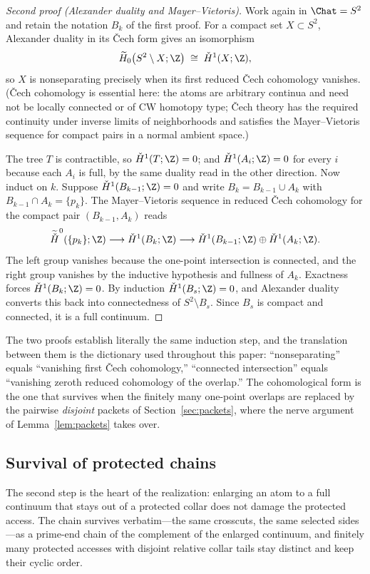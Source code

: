 \begin{proof}[Second proof (Alexander duality and Mayer--Vietoris)]
Work again in $\Chat=S^2$ and retain the notation $B_k$ of the first
proof.  For a compact set $X\subset S^2$, Alexander duality in its
\v{C}ech form \cite[Chapter~6]{Spa66} gives an isomorphism
\[
\widetilde H_0\bigl(S^2\setminus X;\Z\bigr)\;\cong\;\check H^1(X;\Z),
\]
so $X$ is nonseparating precisely when its first reduced \v{C}ech
cohomology vanishes.  (\v{C}ech cohomology is essential here: the atoms
are arbitrary continua and need not be locally connected or of CW
homotopy type; \v{C}ech theory has the required
continuity under inverse limits of neighborhoods and satisfies the
Mayer--Vietoris sequence for compact pairs in a normal ambient space.)

The tree $T$ is contractible, so $\check H^1(T;\Z)=0$; and
$\check H^1(A_i;\Z)=0$ for every $i$ because each $A_i$ is full, by the
same duality read in the other direction.  Now induct on $k$.  Suppose
$\check H^1(B_{k-1};\Z)=0$ and write $B_k=B_{k-1}\cup A_k$ with
$B_{k-1}\cap A_k=\{p_k\}$.  The Mayer--Vietoris sequence in reduced
\v{C}ech cohomology for the compact pair $(B_{k-1},A_k)$ reads
\[
\widetilde{\check H}^0(\{p_k\};\Z)
\longrightarrow
\check H^1(B_k;\Z)
\longrightarrow
\check H^1(B_{k-1};\Z)\oplus\check H^1(A_k;\Z).
\]
The left group vanishes because the one-point intersection is connected,
and the right group vanishes by the inductive hypothesis and fullness of
$A_k$.  Exactness forces $\check H^1(B_k;\Z)=0$.  By induction
$\check H^1(B_s;\Z)=0$, and Alexander duality converts this back into
connectedness of $S^2\setminus B_s$.  Since $B_s$ is compact and
connected, it is a full continuum.
\end{proof}

The two proofs establish literally the same induction step, and the
translation between them is the dictionary used throughout this paper:
``nonseparating'' equals ``vanishing first \v{C}ech cohomology,''
``connected intersection'' equals ``vanishing zeroth reduced cohomology of
the overlap.''  The cohomological form is the one that survives when the
finitely many one-point overlaps are replaced by the pairwise
\emph{disjoint} packets of Section~\ref{sec:packets}, where the nerve
argument of Lemma~\ref{lem:packets} takes over.

\subsection*{Survival of protected chains}
The second step is the heart of the realization: enlarging an atom to a
full continuum that stays out of a protected collar does not damage the
protected access.  The chain survives verbatim---the same crosscuts, the
same selected sides---as a prime-end chain of the complement of the
enlarged continuum, and finitely many protected accesses with disjoint
relative collar tails stay distinct and keep their cyclic order.

